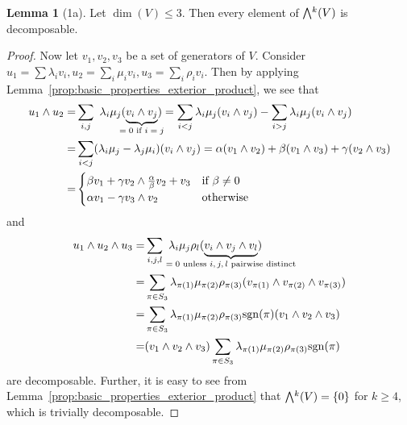 \documentclass{scrartcl}
\newcommand{\sgn}{\mathrm{sgn}}
\newcommand{\extpow}{\mathchoice{{\textstyle\bigwedge}}
    {{\bigwedge}}
    {{\textstyle\wedge}}
    {{\scriptstyle\wedge}}}
\theoremstyle{definition}
\newtheorem{lemma}[definition]{Lemma}
\begin{document}
\begin{lemma}[1a]
    Let $\dim(V) \leq 3$. Then every element of $\extpow^k(V)$ is decomposable.
\end{lemma}
\begin{proof}
    Now let $v_1, v_2, v_3$ be a set of generators of $V$.
    Consider $u_1 = \sum \lambda_i v_i, u_2 = \sum_i \mu_i v_i, u_3 = \sum_i \rho_i v_i$.
    Then by applying Lemma~\ref{prop:basic_properties_exterior_product}, we see that 
    \begin{align*}
        u_1 \wedge u_2 =& \sum_{i, j} \ \lambda_i \mu_j (\underbrace{v_i \wedge v_j}_{\mathclap{\text{$= 0$ if $i = j$}}}) = \sum_{i < j} \lambda_i \mu_j (v_i \wedge v_j) - \sum_{i > j} \lambda_i \mu_j (v_i \wedge v_j) \\
        =& \sum_{i < j} (\lambda_i \mu_j - \lambda_j \mu_i)(v_i \wedge v_j) = \alpha (v_1 \wedge v_2) + \beta (v_1 \wedge v_3) + \gamma (v_2 \wedge v_3) \\
        =& \begin{cases}
            \beta v_1 + \gamma v_2 \wedge \frac \alpha \beta v_2 + v_3 & \text{if $\beta \neq 0$} \\
            \alpha v_1 - \gamma v_3 \wedge v_2 & \text{otherwise}
        \end{cases}
    \end{align*}
    and
    \begin{align*}
        u_1 \wedge u_2 \wedge u_3 =& \sum_{i, j, l} \ \lambda_i \mu_j \rho_l (\underbrace{v_i \wedge v_j \wedge v_l}_{\mathclap{\text{$= 0$ unless $i, j, l$ pairwise distinct}}}) \\
        =& \sum_{\pi \in S_3} \lambda_{\pi(1)} \mu_{\pi(2)} \rho_{\pi(3)} (v_{\pi(1)} \wedge v_{\pi(2)} \wedge v_{\pi(3)}) \\
        =& \sum_{\pi \in S_3} \lambda_{\pi(1)} \mu_{\pi(2)} \rho_{\pi(3)} \sgn(\pi) (v_1 \wedge v_2 \wedge v_3) \\
        =& (v_1 \wedge v_2 \wedge v_3) \sum_{\pi \in S_3} \lambda_{\pi(1)} \mu_{\pi(2)} \rho_{\pi(3)} \sgn(\pi)
    \end{align*}
    are decomposable.
    Further, it is easy to see from Lemma~\ref{prop:basic_properties_exterior_product} that $\extpow^k(V) = \{ 0 \}$ for $k \geq 4$, which is trivially decomposable.
\end{proof}
\end{document}
